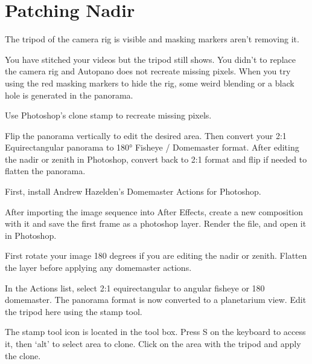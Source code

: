 \section{Patching Nadir}
\pagecolor{white}
\label{chap:48}
\begin{fullwidth}

\problem

{\large The tripod of the camera rig is visible and masking markers aren’t removing it. \par}

You have stitched your videos but the tripod still shows. You didn't \textbf{} to replace the camera rig and Autopano does not recreate missing pixels. When you try using the red masking markers to hide the rig, some weird blending or a black hole is generated in the panorama.

\solution

{\large Use Photoshop’s clone stamp to recreate missing pixels. \par}

Flip the panorama vertically to edit the desired area. Then convert your 2:1 Equirectangular panorama to 180° Fisheye / Domemaster format. After editing the nadir or zenith in Photoshop, convert back to 2:1 format and flip if needed to flatten the panorama.

First, install Andrew Hazelden's Domemaster Actions for Photoshop.

\clearpage

After importing the image sequence into After Effects, create a new composition with it and save the first frame as a photoshop layer. Render the file, and open it in Photoshop.


First rotate your image 180 degrees if you are editing the nadir or zenith. Flatten the layer before applying any domemaster actions.


In the Actions list, select 2:1 equirectangular to angular fisheye or 180 domemaster. The panorama format is now converted to a planetarium view. Edit the tripod here using the stamp tool.

\tip The stamp tool icon is located in the tool box. Press S on the keyboard to access it, then ‘alt’ to select area to clone. Click on the area with the tripod and apply the clone.



\end{fullwidth}
